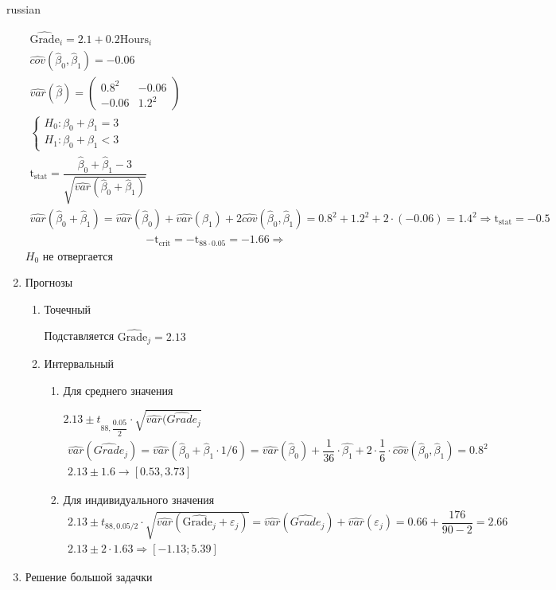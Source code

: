 \documentclass{article}
\begin{document}
\begin{otherlanguage*}{russian}
\begin{enumerate}
\begin{align*}
\widehat{\text{Grade}}_i = 2.1 + 0.2 \text{Hours}_i \\
\widehat{cov} (\hat \beta_0, \hat \beta_1) = -0.06 \\
\widehat{var} (\hat \beta) = \begin{pmatrix}
0.8^2 & -0.06 \\
-0.06 & 1.2^ 2
\end{pmatrix} \\
\begin{cases}
H_0: \beta_0 + \beta_1 = 3 \\
H_1: \beta_0 + \beta_1 < 3 
\end{cases} \\
\text{t}_{\text{stat}} = \dfrac{\hat \beta_0 + \hat \beta_1 - 3}{\sqrt{\widehat{var} (\hat \beta_0 + \hat \beta_1)}} \\
\widehat{var} (\hat \beta_0 + \hat \beta_1) = \widehat{var} (\hat \beta_0) + \widehat{var} (\beta_1) + 2 \widehat{cov} (\hat \beta_0, \hat \beta_1) = 0.8 ^ 2 + 1.2 ^2 + 2 \cdot (-0.06) = 1.4^ 2 \Rightarrow \text{t}_{\text{stat}} = - 0.5 
\end{align*}
\begin{align*}
-\text{t}_{\text{crit}} = - \text{t}_{88 \cdot 0.05} = -1.66 \Rightarrow
\end{align*}
$H_0$ не отвергается 

\item Прогнозы 
\begin{enumerate}
\item Точечный

Подставляется $ \hat{\text{Grade}_j} = 2.13 $

\item Интервальный 

\begin{enumerate}
\item Для среднего значения

$ 2.13 \pm  t_{88, \dfrac{0.05}{2}} \cdot \sqrt{\widehat{var} (\widehat{Grade}_j}$
\begin{align*}
 \widehat{var} (\widehat{Grade}_j) = \widehat{var} (\hat \beta_0 + \hat \beta_1 \cdot 1/6) = \widehat{var} (\hat \beta_0) + \dfrac{1}{36} \cdot \widehat{\beta_1} + 2 \cdot \dfrac{1}{6} \cdot \widehat{cov} (\hat \beta_0, \hat \beta_1) = 0.8^2 \\
2.13 \pm 1.6 \rightarrow [0.53, 3.73]
\end{align*}
\item Для индивидуального значения
\begin{align*}
2.13 \pm t_{88, 0.05 / 2} \cdot \sqrt{\widehat{var} (\widehat{\text{Grade}_j} + \varepsilon_j)} = \widehat{var} (\widehat{Grade}_j) + \widehat{var} (\varepsilon_j) = 0.66 + \dfrac{176}{90-2} = 2.66 \\
2.13 \pm 2 \cdot 1.63 \Rightarrow [-1.13; 5.39] 
\end{align*}
\end{enumerate}
\end{enumerate}
\item Решение большой задачки 


\end{enumerate}
\end{otherlanguage*}
\end{document}
